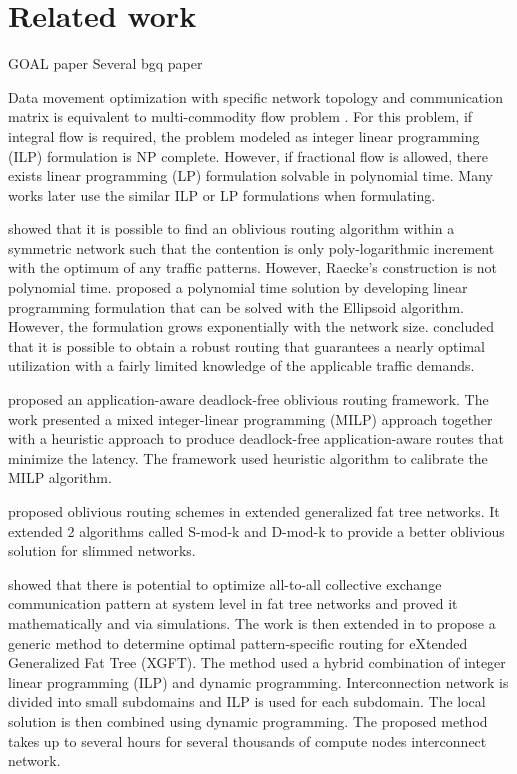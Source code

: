 \section{Related work}
\label{sec:relatedwork}

GOAL paper \cite{singh2003:GOAL}
Several bgq paper

Data movement optimization with specific network topology and communication matrix is equivalent to multi-commodity flow problem \cite{Leighton91}. For this problem, if integral flow is required, the problem modeled as integer linear programming (ILP) formulation is NP complete. However, if fractional flow is allowed, there exists linear programming (LP) formulation solvable in polynomial time. Many works later use the similar ILP or LP formulations when formulating.

\cite{Racke02} showed that it is possible to find an oblivious routing algorithm within a symmetric network such that the contention is only poly-logarithmic increment with the optimum of any traffic patterns. However, Raecke’s construction is not polynomial time. \cite{Azar03} proposed a polynomial time solution by developing linear programming formulation that can be solved with the Ellipsoid algorithm. However, the formulation grows exponentially with the network size. \cite{Applegate06} concluded that it is possible to obtain a robust routing that guarantees a nearly optimal utilization with a fairly limited knowledge of the applicable traffic demands.

\cite{Kinsy09} proposed an application-aware deadlock-free oblivious routing framework. The work presented a mixed integer-linear programming (MILP) approach together with a heuristic approach to produce deadlock-free application-aware routes that minimize the latency. The framework used heuristic algorithm to calibrate the MILP algorithm.

\cite{Rodriguez09} proposed oblivious routing schemes in extended generalized fat tree networks. It extended 2 algorithms called S-mod-k and D-mod-k to provide a better oblivious solution for slimmed networks. 

\cite{Prisacari13a} showed that there is potential to optimize all-to-all collective exchange communication pattern at system level in fat tree networks and proved it mathematically and via simulations. The work is then extended in \cite{Prisacari13b} to propose a generic method to determine optimal pattern-specific routing for eXtended Generalized Fat Tree (XGFT). The method used a hybrid combination of integer linear programming (ILP) and dynamic programming. Interconnection network is divided into small subdomains and ILP is used for each subdomain. The local solution is then combined using dynamic programming. The proposed method takes up to several hours for several thousands of compute nodes interconnect network.

